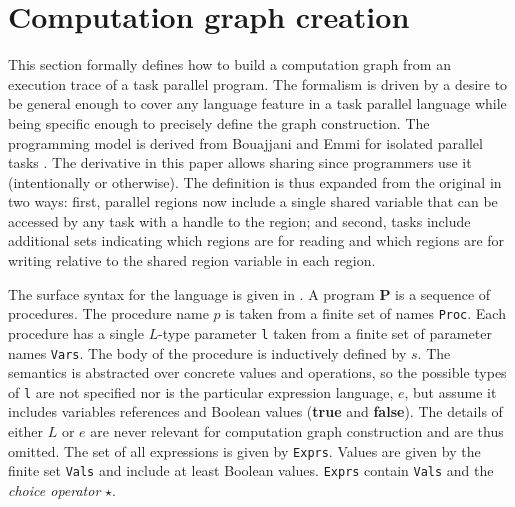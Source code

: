 \section{Computation graph creation} \label{sec:cg}
This section formally defines how to build a computation graph from an execution trace of a task parallel program. The formalism is driven by a desire to be general enough to cover any language feature in a task parallel language while being specific enough to precisely define the graph construction. 
The programming model is derived from Bouajjani and Emmi for isolated parallel tasks \cite{bouajjani}. The derivative in this paper allows sharing since programmers use it (intentionally or otherwise). The definition is thus expanded from the original in two ways: first, parallel regions now include a single shared variable that can be accessed by any task with a handle to the region; and second, tasks include additional sets indicating which regions are for reading and which regions are for writing relative to the shared region variable in each region.

The surface syntax for the language is given in . A program \textbf{P} is a sequence of procedures. The procedure name $p$ is taken from a finite set of names \texttt{Proc}. Each procedure has a single $L$-type parameter \texttt{l} taken from a finite set of parameter names \texttt{Vars}. The body of the procedure is inductively defined by $s$. The semantics is abstracted over concrete values and operations, so the possible types of \texttt{l} are not specified nor is the particular expression language, $e$, but assume it includes variables references and Boolean values (\textbf{true} and \textbf{false}). The details of either $L$ or $e$ are never relevant for computation graph construction and are thus omitted. The set of all expressions is given by \texttt{Exprs}. Values are given by the finite set \texttt{Vals} and include at least Boolean values. \texttt{Exprs} contain \texttt{Vals} and the \emph{choice operator} $\star$. 

